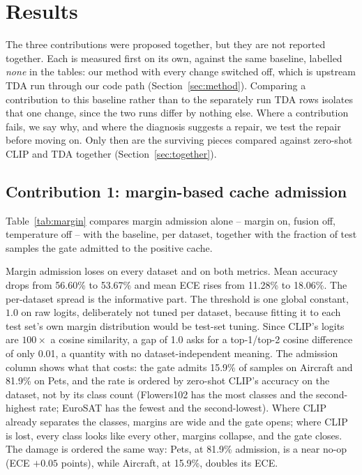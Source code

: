 \section{Results}
\label{sec:results}

The three contributions were proposed together, but they are not reported together. Each is
measured first on its own, against the same baseline, labelled \emph{none} in the tables: our
method with every change switched off, which is upstream TDA run through our code path
(Section~\ref{sec:method}). Comparing a contribution to this baseline rather than to the
separately run TDA rows isolates that one change, since the two runs differ by nothing
else. Where a contribution fails, we say why, and where the diagnosis suggests a repair, we test
the repair before moving on. Only then are the surviving pieces compared against zero-shot CLIP
and TDA together (Section~\ref{sec:together}).

\subsection{Contribution 1: margin-based cache admission}
\label{sec:margin}

Table~\ref{tab:margin} compares margin admission alone -- margin on, fusion off, temperature
off -- with the baseline, per dataset, together with the fraction of test samples
the gate admitted to the positive cache.



Margin admission loses on every dataset and on both metrics. Mean accuracy drops from 56.60\%
to 53.67\% and mean ECE rises from 11.28\% to 18.06\%. The per-dataset spread is the
informative part. The threshold is one global constant, $1.0$ on raw logits, deliberately not tuned per dataset, because fitting it to each test set's own margin
distribution would be test-set tuning. Since CLIP's logits are $100\times$ a cosine similarity,
a gap of 1.0 asks for a top-1/top-2 cosine difference of only 0.01, a quantity with no
dataset-independent meaning. The admission column shows what that costs: the gate admits 15.9\%
of samples on Aircraft and 81.9\% on Pets, and the rate is ordered by zero-shot CLIP's accuracy
on the dataset, not by its class count (Flowers102 has the most classes and the second-highest
rate; EuroSAT has the fewest and the second-lowest). Where CLIP already separates the classes,
margins are wide and the gate opens; where CLIP is lost, every class looks like every other,
margins collapse, and the gate closes. The damage is ordered the same way: Pets, at 81.9\%
admission, is a near no-op (ECE $+0.05$ points), while Aircraft, at 15.9\%, doubles its ECE.

